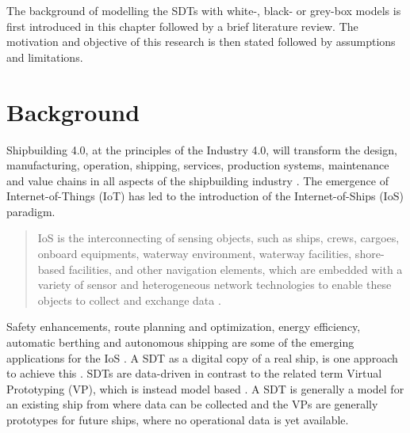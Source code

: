 The background of modelling the SDTs with white-, black- or grey-box models is first introduced in this chapter followed by a brief literature review. The motivation and objective of this research is then stated followed by assumptions and limitations.

\section{Background}
Shipbuilding 4.0, at the principles of the Industry 4.0, will transform the design, manufacturing, operation, shipping, services, production systems, maintenance and value chains in all aspects of the shipbuilding 
industry \cite{stanic_toward_2018}.
The emergence of Internet-of-Things (IoT) has led to the introduction of the Internet-of-Ships (IoS) paradigm. \begin{quote} IoS is the interconnecting of sensing objects, such as ships, crews, cargoes, onboard equipments, waterway environment, waterway facilities, shore-based facilities, and other navigation elements, which are embedded with a variety of sensor and heterogeneous network technologies to enable these objects to collect and exchange data \cite{liu_internet_2016-1}.\end{quote}
Safety enhancements, route planning and optimization, energy efficiency, automatic berthing and autonomous shipping are some of the emerging applications for the IoS \cite{aslam_internet_2020}.
A SDT as a digital copy of a real ship, is one approach to achieve this \cite{chen_review_2021}. 
SDTs are data-driven in contrast to the related term Virtual Prototyping (VP), which is instead model based \cite{major_framework_2021}. A SDT is generally a model for an existing ship from where data can be collected and the VPs are generally prototypes for future ships, where no operational data is yet available.

